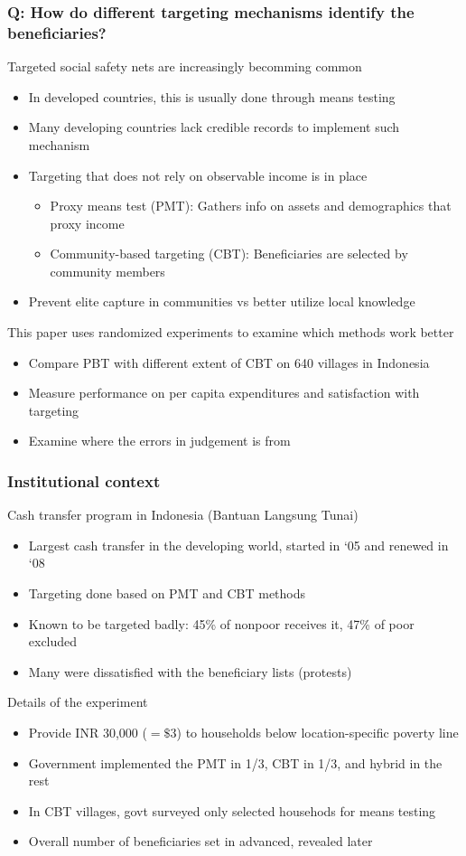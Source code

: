 \documentclass[aspectratio=169]{beamer}
\begin{document}
\begin{frame}
\frametitle{Q: How do different targeting mechanisms identify the beneficiaries?} 
Targeted social safety nets are increasingly becomming common
\begin{itemize}\setlength\itemsep{3pt}
\item In developed countries, this is usually done through means testing
\item Many developing countries lack credible records to implement such mechanism 
\item Targeting that does not rely on observable income is in place
\begin{itemize}\setlength\itemsep{3pt}
  \item Proxy means test (PMT): Gathers info on assets and demographics that proxy income 
  \item Community-based targeting (CBT): Beneficiaries are selected by community members
\end{itemize}
\item Prevent elite capture in communities vs better utilize local knowledge
\end{itemize}\medskip
This paper uses randomized experiments to examine which methods work better
\begin{itemize}\setlength\itemsep{3pt}
  \item Compare PBT with different extent of CBT on 640 villages in Indonesia
  \item Measure performance on per capita expenditures and satisfaction with targeting
  \item Examine where the errors in judgement is from
\end{itemize}
\end{frame}



\begin{frame}
\frametitle{Institutional context} 
Cash transfer program in Indonesia (Bantuan Langsung Tunai)
\begin{itemize}\setlength\itemsep{3pt}
\item Largest cash transfer in the developing world, started in `05 and renewed in `08
\item Targeting done based on PMT and CBT methods
\item Known to be targeted badly: 45\% of nonpoor receives it, 47\% of poor excluded
\item Many were dissatisfied with the beneficiary lists (protests)

\end{itemize}\medskip
Details of the experiment
\begin{itemize}\setlength\itemsep{3pt}
\item Provide INR 30,000 ($=\$3$) to households below location-specific poverty line
\item Government implemented the PMT in 1/3, CBT in 1/3, and hybrid in the rest
\item In CBT villages, govt surveyed only selected househods for means testing
\item Overall number of beneficiaries set in advanced, revealed later
\end{itemize}
\end{frame}
\end{document}
